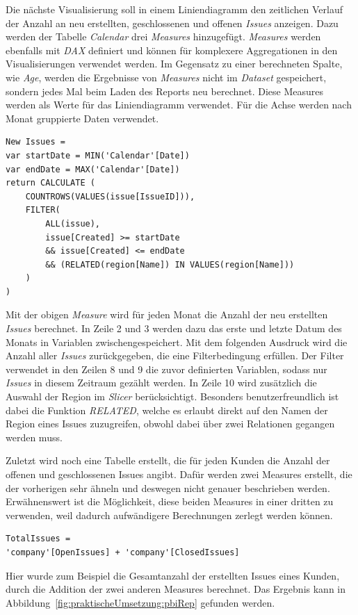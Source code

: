 Die nächste Visualisierung soll in einem Liniendiagramm den zeitlichen Verlauf der Anzahl an neu erstellten, geschlossenen und offenen \textit{Issues} anzeigen. Dazu werden der Tabelle \textit{Calendar} drei \textit{Measures} hinzugefügt. \textit{Measures} werden ebenfalls mit \textit{DAX} definiert und können für komplexere Aggregationen in den Visualisierungen verwendet werden. Im Gegensatz zu einer berechneten Spalte, wie \textit{Age}, werden die Ergebnisse von \textit{Measures} nicht im \textit{Dataset} gespeichert, sondern jedes Mal beim Laden des Reports neu berechnet. Diese Measures werden als Werte für das Liniendiagramm verwendet. Für die Achse werden nach Monat gruppierte Daten verwendet.
\begin{lstlisting}[frame=single,caption=Measure: Anzahl neuer \textit{Issues} in einem Zeitabschnitt,captionpos=b]
New Issues = 
var startDate = MIN('Calendar'[Date])
var endDate = MAX('Calendar'[Date])
return CALCULATE (
    COUNTROWS(VALUES(issue[IssueID])), 
    FILTER(
        ALL(issue),
        issue[Created] >= startDate 
        && issue[Created] <= endDate 
        && (RELATED(region[Name]) IN VALUES(region[Name]))
    )
)
\end{lstlisting}
\noindent Mit der obigen \textit{Measure} wird für jeden Monat die Anzahl der neu erstellten \textit{Issues} berechnet. In Zeile 2 und 3 werden dazu das erste und letzte Datum des Monats in Variablen zwischengespeichert. Mit dem folgenden Ausdruck wird die Anzahl aller \textit{Issues} zurückgegeben, die eine Filterbedingung erfüllen. Der Filter verwendet in den Zeilen 8 und 9 die zuvor definierten Variablen, sodass nur \textit{Issues} in diesem Zeitraum gezählt werden. In Zeile 10 wird zusätzlich die Auswahl der Region im \textit{Slicer} berücksichtigt. Besonders benutzerfreundlich ist dabei die Funktion \textit{RELATED}, welche es erlaubt direkt auf den Namen der Region eines Issues zuzugreifen, obwohl dabei über zwei Relationen gegangen werden muss. 

Zuletzt wird noch eine Tabelle erstellt, die für jeden Kunden die Anzahl der offenen und geschlossenen Issues angibt. Dafür werden zwei Measures erstellt, die der vorherigen sehr ähneln und deswegen nicht genauer beschrieben werden. Erwähnenswert ist die Möglichkeit, diese beiden Measures in einer dritten zu verwenden, weil dadurch aufwändigere Berechnungen zerlegt werden können.
\begin{lstlisting}[frame=single,caption= Verwendung von Measures in Measure,captionpos=b]
TotalIssues = 
'company'[OpenIssues] + 'company'[ClosedIssues]
\end{lstlisting}
\noindent Hier wurde zum Beispiel die Gesamtanzahl der erstellten Issues eines Kunden, durch die Addition der zwei anderen Measures berechnet. Das Ergebnis kann in Abbildung~\ref{fig:praktischeUmsetzung:pbiRep} gefunden werden.


